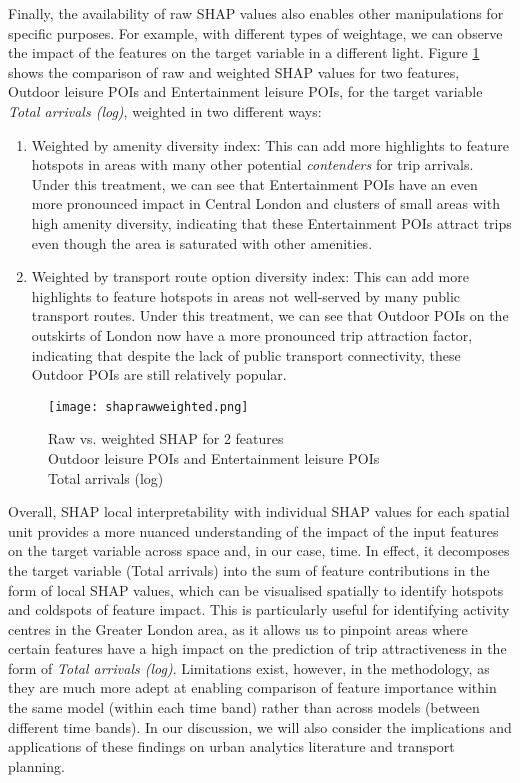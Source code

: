 Finally, the availability of raw SHAP values also enables other manipulations for specific purposes. For example, with different types of weightage, we can observe the impact of the features on the target variable in a different light. Figure \ref{fig:shaprawweighted} shows the comparison of raw and weighted SHAP values for two features, Outdoor leisure POIs and Entertainment leisure POIs, for the target variable \textit{Total arrivals (log)}, weighted in two different ways:

\begin{enumerate}
    \setlength\itemsep{0em}
    \item Weighted by amenity diversity index: This can add more highlights to feature hotspots in areas with many other potential \textit{contenders} for trip arrivals. Under this treatment, we can see that Entertainment POIs have an even more pronounced impact in Central London and clusters of small areas with high amenity diversity, indicating that these Entertainment POIs attract trips even though the area is saturated with other amenities.
    \item Weighted by transport route option diversity index: This can add more highlights to feature hotspots in areas not well-served by many public transport routes. Under this treatment, we can see that Outdoor POIs on the outskirts of London now have a more pronounced trip attraction factor, indicating that despite the lack of public transport connectivity, these Outdoor POIs are still relatively popular.
\end{enumerate}

\begin{figure}[!hbt]
    \centering
    \texttt{[image: shaprawweighted.png]}
    \captionsetup{justification=centering}
    \caption{Raw vs. weighted SHAP for 2 features\\Outdoor leisure POIs and Entertainment leisure POIs \\Total arrivals (log)}
    \label{fig:shaprawweighted}
\end{figure}

Overall, SHAP local interpretability with individual SHAP values for each spatial unit provides a more nuanced understanding of the impact of the input features on the target variable across space and, in our case, time. In effect, it decomposes the target variable (Total arrivals) into the sum of feature contributions in the form of local SHAP values, which can be visualised spatially to identify hotspots and coldspots of feature impact. This is particularly useful for identifying activity centres in the Greater London area, as it allows us to pinpoint areas where certain features have a high impact on the prediction of trip attractiveness in the form of \textit{Total arrivals (log)}. Limitations exist, however, in the methodology, as they are much more adept at enabling comparison of feature importance within the same model (within each time band) rather than across models (between different time bands). In our discussion, we will also consider the implications and applications of these findings on urban analytics literature and transport planning.